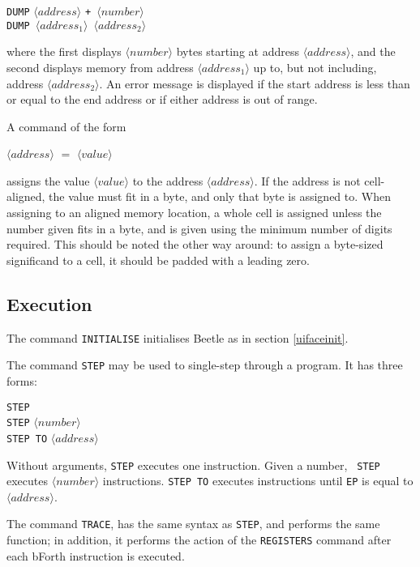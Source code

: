 \documentclass[english]{article}
\newcommand{\angb}[1]{$\langle #1\rangle$}
\begin{document}
\begin{center}
{\tt DUMP} \angb{address} \tt{+} \angb{number}\\
{\tt DUMP} \angb{address_1} \angb{address_2}
\end{center}

where the first displays \angb{number} bytes starting at address
\angb{address}, and the second displays memory from address \angb{address_1}
up to, but not including, address \angb{address_2}. An error message is
displayed if the start address is less than or equal to the end address or if
either address is out of range.

A command of the form

\begin{center}\angb{address} $=$ \angb{value}\end{center}

assigns the value \angb{value} to the address \angb{address}. If the address
is not cell-aligned, the value must fit in a byte, and only that byte is
assigned to. When assigning to an aligned memory location, a whole cell is
assigned unless the number given fits in a byte, and is given using the
minimum number of digits required. This should be noted the other way around:
to assign a byte-sized significand to a cell, it should be padded with a
leading zero.

\subsection{Execution}

The command {\tt INITIALISE} initialises Beetle as in section
\ref{uifaceinit}.

The command {\tt STEP} may be used to single-step through a program. It has
three forms:

\begin{center}
{\tt STEP}\\
{\tt STEP} \angb{number}\\
{\tt STEP TO} \angb{address}
\end{center}

Without arguments, {\tt STEP} executes one instruction. Given a number, {\tt
STEP} executes \angb{number} instructions. {\tt STEP TO} executes
instructions until {\tt EP} is equal to \angb{address}.

The command {\tt TRACE}, has the same syntax as {\tt STEP}, and performs the
same function; in addition, it performs the action of the {\tt REGISTERS}
command after each bForth instruction is executed.
\end{document}
